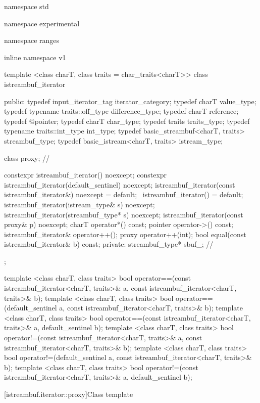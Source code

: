 \begin{codeblock}
namespace std { namespace experimental { namespace ranges { inline namespace v1 {
  template <class charT, class traits = char_traits<charT>>
  class istreambuf_iterator {
  public:
    typedef input_iterator_tag             iterator_category;
    typedef charT                          value_type;
    typedef typename traits::off_type      difference_type;
    typedef charT                          reference;
    typedef @\unspec@                   pointer;
    typedef charT                          char_type;
    typedef traits                         traits_type;
    typedef typename traits::int_type      int_type;
    typedef basic_streambuf<charT, traits> streambuf_type;
    typedef basic_istream<charT, traits>   istream_type;

    class proxy;                           // \expos

    constexpr istreambuf_iterator() noexcept;
    constexpr istreambuf_iterator(default_sentinel) noexcept;
    istreambuf_iterator(const istreambuf_iterator&) noexcept = default;
    ~istreambuf_iterator() = default;
    istreambuf_iterator(istream_type& s) noexcept;
    istreambuf_iterator(streambuf_type* s) noexcept;
    istreambuf_iterator(const proxy& p) noexcept;
    charT operator*() const;
    pointer operator->() const;
    istreambuf_iterator& operator++();
    proxy operator++(int);
    bool equal(const istreambuf_iterator& b) const;
  private:
    streambuf_type* sbuf_;                // \expos
  };

  template <class charT, class traits>
    bool operator==(const istreambuf_iterator<charT, traits>& a,
            const istreambuf_iterator<charT, traits>& b);
  template <class charT, class traits>
    bool operator==(default_sentinel a,
            const istreambuf_iterator<charT, traits>& b);
  template <class charT, class traits>
    bool operator==(const istreambuf_iterator<charT, traits>& a,
            default_sentinel b);
  template <class charT, class traits>
    bool operator!=(const istreambuf_iterator<charT, traits>& a,
            const istreambuf_iterator<charT, traits>& b);
  template <class charT, class traits>
    bool operator!=(default_sentinel a,
            const istreambuf_iterator<charT, traits>& b);
  template <class charT, class traits>
    bool operator!=(const istreambuf_iterator<charT, traits>& a,
            default_sentinel b);
}}}}
\end{codeblock}

[istreambuf.iterator::proxy]{Class template }

